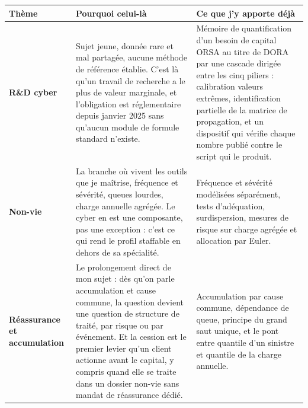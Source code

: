 \documentclass[11pt,a4paper]{article}
\begin{document}
\begin{center}\footnotesize
\begin{tabular}{@{}L{2.5cm} L{6.1cm} L{7.6cm}@{}}
\toprule
\textbf{Thème} & \textbf{Pourquoi celui-là} & \textbf{Ce que j'y apporte déjà} \\
\midrule
\textbf{R\&D cyber}
& Sujet jeune, donnée rare et mal partagée, aucune méthode de référence établie. C'est là
  qu'un travail de recherche a le plus de valeur marginale, et l'obligation est
  réglementaire depuis janvier 2025 sans qu'aucun module de formule standard n'existe.
& Mémoire de quantification d'un besoin de capital ORSA au titre de DORA par une cascade
  dirigée entre les cinq piliers : calibration valeurs extrêmes, identification partielle
  de la matrice de propagation, et un dispositif qui vérifie chaque nombre publié contre le
  script qui le produit. \\
\addlinespace
\textbf{Non-vie}
& La branche où vivent les outils que je maîtrise, fréquence et sévérité, queues lourdes,
  charge annuelle agrégée. Le cyber en est une composante, pas une exception : c'est ce qui
  rend le profil staffable en dehors de sa spécialité.
& Fréquence et sévérité modélisées séparément, tests d'adéquation, surdispersion, mesures
  de risque sur charge agrégée et allocation par Euler. \\
\addlinespace
\textbf{Réassurance et accumulation}
& Le prolongement direct de mon sujet : dès qu'on parle accumulation et cause commune, la
  question devient une question de structure de traité, par risque ou par événement. Et la
  cession est le premier levier qu'un client actionne avant le capital, y compris quand elle
  se traite dans un dossier non-vie sans mandat de réassurance dédié.
& Accumulation par cause commune, dépendance de queue, principe du grand saut unique, et le
  pont entre quantile d'un sinistre et quantile de la charge annuelle. \\
\bottomrule
\end{tabular}
\end{center}
\end{document}
